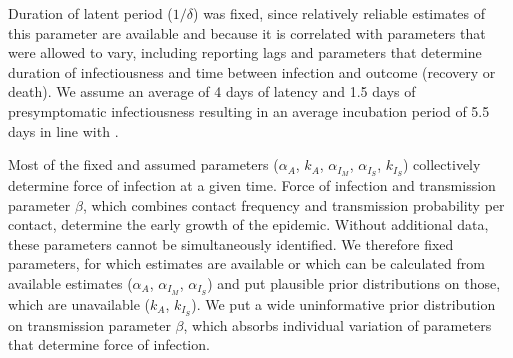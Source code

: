 \documentclass[11pt]{article}
\begin{document}
Duration of latent period ($1/\delta$) was fixed, since relatively reliable estimates of this parameter are available and because it is correlated with parameters that were allowed to vary, including reporting lags and parameters that determine duration of infectiousness and time between infection and outcome (recovery or death). We assume an average of 4 days of latency \citep{li2020substantial, salje2020estimating} and 1.5 days of presymptomatic infectiousness \citep{wei2020presymptomatic} resulting in an average incubation period of 5.5 days in line with \citep{lauer2020incubation, bi2020epidemiology, li2020early, linton2020incubation, he2020estimation, salje2020estimating}. 

Most of the fixed and assumed parameters ($\alpha_A$, $k_A$, $\alpha_{I_M}$, $\alpha_{I_S}$, $k_{I_S}$) collectively determine force of infection at a given time. Force of infection and transmission parameter $\beta$, which combines contact frequency and transmission probability per contact, determine the early growth of the epidemic. Without additional data, these parameters cannot be simultaneously identified. We therefore fixed parameters, for which estimates are available or which can be calculated from available estimates ($\alpha_A$, $\alpha_{I_M}$, $\alpha_{I_S}$) and put plausible prior distributions on those, which are unavailable ($k_A$, $k_{I_S}$). We put a wide uninformative prior distribution on transmission parameter $\beta$, which absorbs individual variation of parameters that determine force of infection.
\end{document}
